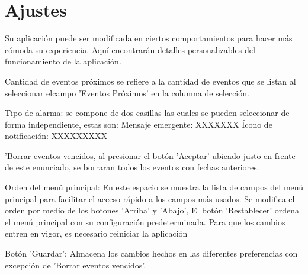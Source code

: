 \chapter{Ajustes}
\label{sec:preferencias}
Su aplicaci\'on puede ser modificada en ciertos comportamientos para hacer
m\'as c\'omoda su experiencia. Aqu\'i  encontrar\'an  detalles  personalizables del funcionamiento de la aplicaci\'on.

 
Cantidad de eventos pr\'oximos se refiere a la cantidad de eventos que se listan al seleccionar elcampo 'Eventos Pr\'oximos' en la columna de selecci\'on.
 
Tipo de alarma:  se compone de dos casillas  las cuales se pueden seleccionar de forma independiente, estas son:
     	Mensaje emergente: XXXXXXX
     	\'Icono de notificaci\'on: XXXXXXXXX
  
'Borrar eventos vencidos, al presionar el bot\'on 'Aceptar' ubicado justo en frente de este enunciado, se borraran todos los eventos con fechas anteriores.
 
Orden del men\'u principal:
En este espacio se muestra la lista de campos del men\'u principal para facilitar el acceso r\'apido a los campos m\'as usados. Se modifica el orden por medio de los botones 'Arriba' y 'Abajo', El bot\'on 'Restablecer' ordena el men\'u principal con su configuraci\'on predeterminada. Para que los cambios entren en vigor, es necesario reiniciar la aplicaci\'on
 
Bot\'on 'Guardar': Almacena los cambios hechos en las diferentes preferencias con excepci\'on de 'Borrar eventos vencidos'.